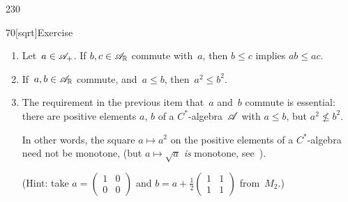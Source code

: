 \begin{parsec}{230}
\begin{point}{70}[sqrt]{Exercise}
\begin{enumerate}
\item
Let~$a\in\mathscr{A}_{+}$.
If $b,c\in \mathscr{A}_{\mathbb{R}}$ commute with~$a$,
then $b\leq c$ implies $ab\leq ac$.

\item
If~$a,b\in\mathscr{A}_{\mathbb{R}}$ commute, and~$a\leq b$, then~$a^2\leq b^2$.

\item
The requirement in the previous item  that~$a$ and~$b$ commute is essential:
there are positive elements $a$, $b$ of a $C^*$-algebra~$\mathscr{A}$
with $a\leq b$, but $a^2 \nleq b^2$.

In other words, the square $a\mapsto a^2$
on the positive elements of a $C^*$-algebra
need not be monotone,
(but $a\mapsto \sqrt{a}$ \emph{is} monotone, see~).

(Hint: take $a=(\begin{smallmatrix}1&0\\0&0\end{smallmatrix})$
and $b=a+\frac{1}{2}(\begin{smallmatrix}1&1\\1&1\end{smallmatrix})$
from~$M_2$.)
\end{enumerate}
\end{point}
\end{parsec}
